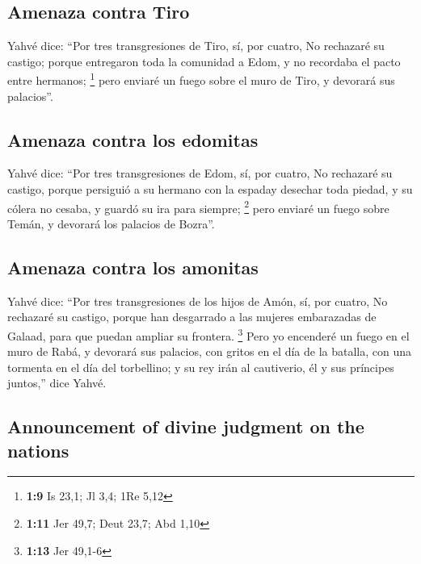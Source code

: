 \begin{paracol}{2}
\hypertarget{amenaza-contra-tiro}{%
\subsection{Amenaza contra Tiro}\label{amenaza-contra-tiro}}

 Yahvé dice: ``Por tres transgresiones de Tiro, sí, por
cuatro, No rechazaré su castigo; porque entregaron toda la comunidad a
Edom, y no recordaba el pacto entre hermanos; \footnote{\textbf{1:9} Is
  23,1; Jl 3,4; 1Re 5,12}  pero enviaré un fuego sobre el
muro de Tiro, y devorará sus palacios''.

\hypertarget{amenaza-contra-los-edomitas}{%
\subsection{Amenaza contra los
edomitas}\label{amenaza-contra-los-edomitas}}

 Yahvé dice: ``Por tres transgresiones de Edom, sí, por
cuatro, No rechazaré su castigo, porque persiguió a su hermano con la
espaday desechar toda piedad, y su cólera no cesaba, y guardó su ira
para siempre; \footnote{\textbf{1:11} Jer 49,7; Deut 23,7; Abd 1,10}
 pero enviaré un fuego sobre Temán, y devorará los
palacios de Bozra''.

\hypertarget{amenaza-contra-los-amonitas}{%
\subsection{Amenaza contra los
amonitas}\label{amenaza-contra-los-amonitas}}

 Yahvé dice: ``Por tres transgresiones de los hijos de
Amón, sí, por cuatro, No rechazaré su castigo, porque han desgarrado a
las mujeres embarazadas de Galaad, para que puedan ampliar su frontera.
\footnote{\textbf{1:13} Jer 49,1-6}  Pero yo encenderé un
fuego en el muro de Rabá, y devorará sus palacios, con gritos en el día
de la batalla, con una tormenta en el día del torbellino;
 y su rey irán al cautiverio, él y sus príncipes
juntos,'' dice Yahvé.

\switchcolumn
\begin{otherlanguage}{english}

\hypertarget{announcement-of-divine-judgment-on-the-nations}{%
\subsection{Announcement of divine judgment on the
nations}\label{announcement-of-divine-judgment-on-the-nations}}


\end{otherlanguage}
\end{paracol}
